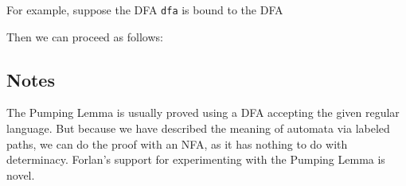 For example, suppose the DFA \texttt{dfa} is bound to the
DFA
\begin{center}

\end{center}
Then we can proceed as follows:

%

\subsection{Notes}

The Pumping Lemma is usually proved using a DFA accepting the given
regular language.  But because we have described the meaning of
automata via labeled paths, we can do the proof with an NFA, as it has
nothing to do with determinacy.  Forlan's support for experimenting
with the Pumping Lemma is novel.

